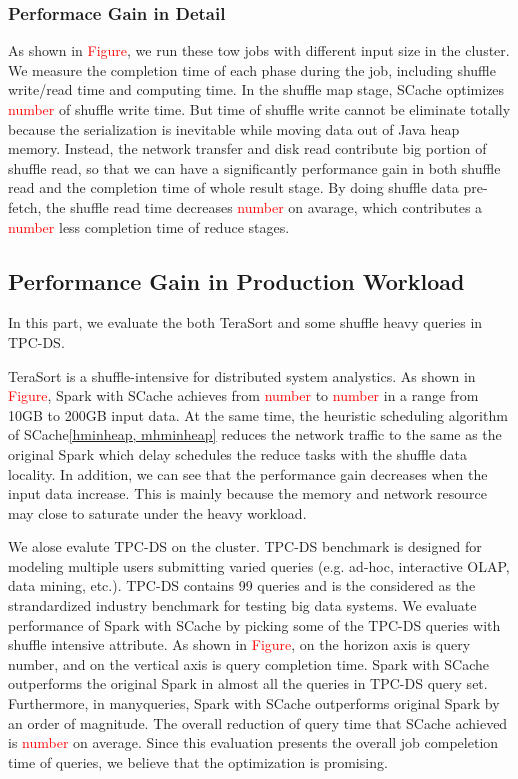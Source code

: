 \subsubsection{Performace Gain in Detail}
As shown in \textcolor{red}{Figure}, we run these tow jobs with different input size in the cluster. We measure the completion time of each phase during the job, including shuffle write/read time and computing time. In the shuffle map stage, SCache optimizes \textcolor{red}{number} of shuffle write time. But time of shuffle write cannot be eliminate totally because the serialization is  inevitable while moving data out of Java heap memory. Instead, the network transfer and disk read contribute big portion of shuffle read, so that we can have a significantly performance gain in both shuffle read and the completion time of whole result stage. By doing shuffle data pre-fetch, the shuffle read time decreases \textcolor{red}{number} on avarage, which contributes a \textcolor{red}{number} less completion time of reduce stages.

\subsection{Performance Gain in Production Workload}
In this part, we evaluate the both TeraSort\cite{spark-tera} and some shuffle heavy queries in TPC-DS\cite{tpcds}. 

TeraSort is a shuffle-intensive  for distributed system analystics. As shown in \textcolor{red}{Figure}, Spark with SCache achieves from \textcolor{red}{number} to \textcolor{red}{number} in a range from 10GB to 200GB input data. At the same time, the heuristic scheduling algorithm of SCache\ref{hminheap, mhminheap} reduces the network traffic to the same as the original Spark which delay schedules the reduce tasks with the shuffle data locality. In addition, we can see that the performance gain decreases when the input data increase. This is mainly because the memory and network resource may close to saturate under the heavy workload. 

We alose evalute TPC-DS\cite{tpcds} on the cluster. TPC-DS benchmark is designed for modeling multiple users submitting varied queries (e.g. ad-hoc, interactive OLAP, data mining, etc.). TPC-DS contains 99 queries and is the considered as the  strandardized industry benchmark for testing big data systems. We evaluate performance of Spark with SCache by picking some of the TPC-DS queries with shuffle intensive attribute. As shown in \textcolor{red}{Figure}, on the horizon axis is query number, and on the vertical axis is query completion time. Spark with SCache outperforms the original Spark in almost all the queries in TPC-DS query set. Furthermore, in manyqueries, Spark with SCache outperforms original Spark by an order of magnitude. The overall reduction of query time that SCache achieved is \textcolor{red}{number} on average. Since this evaluation presents the overall job compeletion time of queries, we believe that the optimization is promising.

